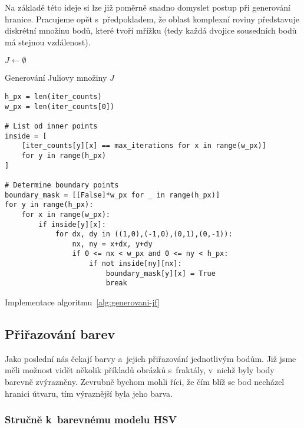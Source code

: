 Na základě této ideje si lze již poměrně snadno domyslet postup při generování hranice. Pracujeme opět s~předpokladem, že oblast komplexní roviny představuje diskrétní množinu bodů, které tvoří mřížku (tedy každá dvojice sousedních bodů má stejnou vzdálenost). 
\begin{algorithm}[h]
    $J\gets\emptyset$\;
    \;
    \caption{Generování Juliovy množiny $J$}
    \label{alg:generovani-jf}
\end{algorithm}
\begin{program}
\begin{lstlisting}[style=python]
h_px = len(iter_counts)
w_px = len(iter_counts[0])

# List od inner points
inside = [
    [iter_counts[y][x] == max_iterations for x in range(w_px)]
    for y in range(h_px)
]

# Determine boundary points
boundary_mask = [[False]*w_px for _ in range(h_px)]
for y in range(h_px):
    for x in range(w_px):
        if inside[y][x]:
            for dx, dy in ((1,0),(-1,0),(0,1),(0,-1)):
                nx, ny = x+dx, y+dy
                if 0 <= nx < w_px and 0 <= ny < h_px:
                    if not inside[ny][nx]:
                        boundary_mask[y][x] = True
                        break
\end{lstlisting}
    \caption{Implementace algoritmu~\ref{alg:generovani-jf}}
    \label{prog:generovani-jf}
\end{program}

\subsection{Přiřazování barev}\label{subsec:prirazovani-barev}

Jako poslední nás čekají barvy a~jejich přiřazování jednotlivým bodům. Již jsme měli možnost vidět několik příkladů obrázků s~fraktály, v~nichž byly body barevně zvýrazněny. Zevrubně bychom mohli říci, že čím blíž se bod necházel hranici útvaru, tím výraznější byla jeho barva.

\subsubsection{Stručně k~barevnému modelu HSV}

